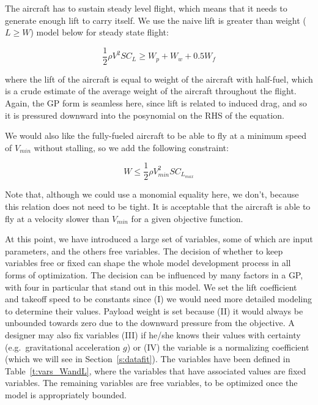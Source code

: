The aircraft has to sustain steady level flight, which means
that it needs to generate enough lift to carry itself. We use the naive
lift is greater than weight ($L \geq W$)
model below for steady state flight:

\begin{equation}
   \frac{1}{2} \rho V^2 S C_L  \geq  W_p + W_w + 0.5 W_f
\end{equation}

where the lift of the aircraft is equal to weight of the aircraft with half-fuel, 
which is a crude estimate of the average weight of the aircraft throughout the flight.
Again, the \gls{GP} form is seamless here, since lift is related to
induced drag, and so it is pressured downward into the posynomial on the \gls{RHS} of the equation.

We would also like the fully-fueled aircraft to be able to fly at a minimum speed 
of $V_{min}$ without stalling, so we add the following constraint:

\begin{equation}
    W \leq \frac{1}{2} \rho V_{min}^2 S C_{L_{max}}
\end{equation}

Note that, although we could use a monomial equality here, we don't, because this
relation does not need to be tight. It is acceptable that the aircraft is able to
fly at a velocity slower than $V_{min}$ for a given objective function.

At this point, we have introduced a large set of variables, some of which are input
parameters, and the others free variables. The decision of whether to keep variables free or fixed
can shape the whole model development process in all forms of optimization.
The decision can be influenced by many
factors in a \gls{GP}, with four in particular that stand out in this model.
We set the lift coefficient and takeoff speed
to be constants since (I) we would need
more detailed modeling to determine their values. Payload weight is set
because (II) it would always be unbounded towards zero due to the downward pressure from
the objective. A designer may also fix variables (III) if he/she knows their values with
certainty (e.g.\ gravitational acceleration $g$) or (IV) the variable is a normalizing
coefficient (which we will see in Section~\ref{s:datafit}).
The variables have been defined in Table~\ref{t:vars_WandL}, where the variables that
have associated values are fixed variables.
The remaining variables are free variables, to be optimized once the model
is appropriately bounded.

